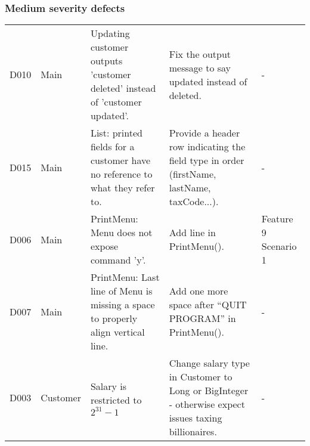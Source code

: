 \subsubsection{Medium severity defects}
\begin{table}[H]
\renewcommand{\thefootnote}{\roman{footnote}} 
\footnotesize 
\begin{minipage}{\textwidth}

\begin{tabularx}{\textwidth}{| c | P | X | X | P |}
\hline %
 &  &  &  &  \\
\hline %
D010 
& Main 
& Updating customer outputs 'customer deleted' instead of 'customer updated'.
& Fix the output message to say updated instead of deleted.
& -\\
\hline %
D015 
& Main 
& List: printed fields for a customer have no reference to what they refer to.
& Provide a header row indicating the field type in order (firstName, lastName, taxCode...).  
& -\\
\hline %
D006 
& Main
& PrintMenu: Menu does not expose command ’y’.
& Add line in PrintMenu().
& Feature 9 Scenario 1 \\ %
\hline %
D007 
& Main
& PrintMenu: Last line of Menu is missing a space to properly align vertical line.
& Add one more space after “QUIT PROGRAM” in PrintMenu(). 
& -\\
\hline %
D003 
& Customer
& Salary is restricted to $2^{31}−1$
& Change salary type in Customer to Long or BigInteger - otherwise expect issues taxing billionaires. 
& -\\
\hline %

\end{tabularx}
\end{minipage}
\end{table}
